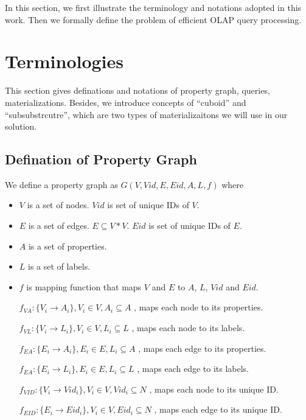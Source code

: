 In this section, we first illustrate the terminology and notations adopted in this work. Then we formally define the problem of efficient OLAP query processing. 

\section{Terminologies}

This section gives definations and notations of property graph, queries, materializations. Besides, we introduce concepts of ``cuboid'' and ``subsubstrcutre'', which are two types of materializaitons we will use in our solution. 

\subsection{Defination of Property Graph}
We define a property graph as $G(V, Vid, E, Eid, A, L, f)$ where
\begin{itemize} 
\item $V$ is a set of nodes. $Vid$ is set of unique IDs of $V$.
\item $E$ is a set of edges. $E \subseteq V * V$. $Eid$ is set of unique IDs of $E$.
\item $A$ is a set of properties.
\item $L$ is a set of labels.
\item $f$ is mapping function that maps $V$ and $E$ to $A$, $L$, $Vid$ and $Eid$. 

$f_{VA}: \{V_{i} \rightarrow A_{i}\}, V_{i}\in V, A_{i} \subseteq A$ , maps each node to its properties.

$f_{VL}: \{V_{i} \rightarrow L_{i}\}, V_{i}\in V, L_{i} \subseteq L$ , maps each node to its labels.

$f_{EA}: \{E_{i} \rightarrow A_{i}\}, E_{i}\in E, L_{i} \subseteq A$ , maps each edge to its properties.

$f_{EA}: \{E_{i} \rightarrow L_{i}\}, E_{i}\in E, L_{i} \subseteq L$ , maps each edge to its labels.

$f_{VID}: \{V_{i} \rightarrow Vid_{i}\}, V_{i}\in V, Vid_{i} \subseteq N$ , maps each node to its unique ID.

$f_{EID}: \{E_{i} \rightarrow Eid_{i}\}, V_{i}\in V, Eid_{i} \subseteq N$ , maps each edge to its unique ID.

\end{itemize} 


